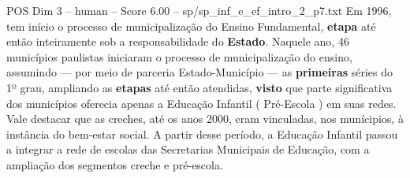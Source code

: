 \begin{textsample}{POS Dim 3 – human – Score 6.00 – sp/sp\_inf\_e\_ef\_intro\_2\_p7.txt}  \label{ex:f3_pos_010}
Em 1996, tem início o processo de municipalização do Ensino Fundamental, \textbf{etapa} até então inteiramente sob a responsabilidade do \textbf{Estado}.
Naquele ano, 46 municípios paulistas iniciaram o processo de municipalização do ensino, assumindo — por meio de parceria Estado-Município — as \textbf{primeiras} séries do 1º grau, ampliando as \textbf{etapas} até então atendidas, \textbf{visto} que parte significativa dos municípios oferecia apenas a Educação Infantil ( Pré-Escola ) em suas redes.
Vale destacar que as creches, até os anos 2000, eram vinculadas, nos munícipios, à instância do bem-estar social.
A partir desse período, a Educação Infantil passou a integrar a rede de escolas das Secretarias Municipais de Educação, com a ampliação dos segmentos creche e pré-escola.

\end{textsample}

